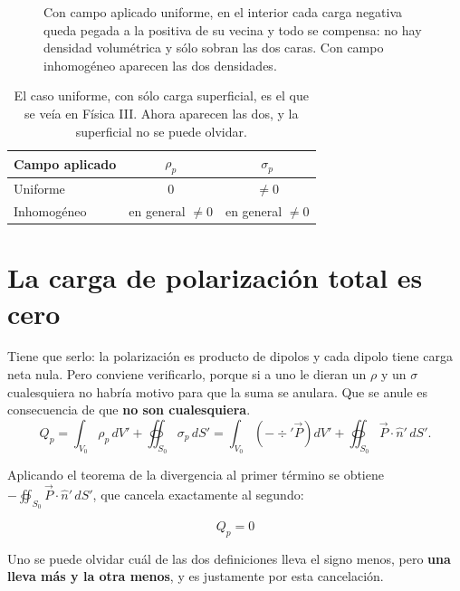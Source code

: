 \documentclass[12pt,a4paper]{article}
\begin{document}
\begin{figure}[H]
  \centering
  
  \caption{Con campo aplicado uniforme, en el interior cada carga negativa queda
  pegada a la positiva de su vecina y todo se compensa: no hay densidad
  volumétrica y sólo sobran las dos caras. Con campo inhomogéneo aparecen las
  dos densidades.}
\end{figure}

\begin{table}[H]
  \centering
  \begin{tabular}{lcc}
    \toprule
    Campo aplicado & $\rho_p$ & $\sigma_p$ \\
    \midrule
    Uniforme      & $0$                   & $\neq 0$ \\
    Inhomogéneo   & en general $\neq 0$   & en general $\neq 0$ \\
    \bottomrule
  \end{tabular}
  \caption{El caso uniforme, con sólo carga superficial, es el que se veía en
  Física III. Ahora aparecen las dos, y la superficial no se puede olvidar.}
\end{table}

\section{La carga de polarización total es cero}

Tiene que serlo: la polarización es producto de dipolos y cada dipolo tiene carga
neta nula. Pero conviene verificarlo, porque si a uno le dieran un $\rho$ y un
$\sigma$ cualesquiera no habría motivo para que la suma se anulara. Que se anule
es consecuencia de que \textbf{no son cualesquiera}.
\[
Q_p = \int_{V_0} \rho_p \, dV' + \oiint_{S_0} \sigma_p \, dS'
= \int_{V_0} \left(-\div' \vec P\right) dV'
+ \oiint_{S_0} \vec P \cdot \hat n'\, dS' .
\]

Aplicando el teorema de la divergencia al primer término se obtiene
$-\oiint_{S_0} \vec P \cdot \hat n'\, dS'$, que cancela exactamente al segundo:

\begin{keybox}
\[
\boxed{\ Q_p = 0\ }
\]
\end{keybox}

\begin{notebox}
Uno se puede olvidar cuál de las dos definiciones lleva el signo menos, pero
\textbf{una lleva más y la otra menos}, y es justamente por esta cancelación.
\end{notebox}
\end{document}
